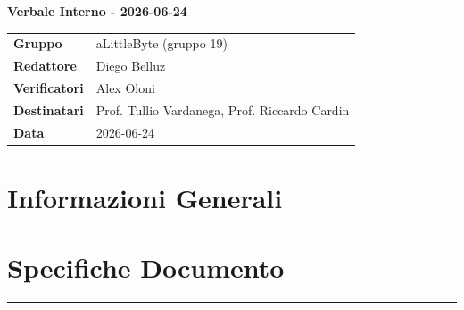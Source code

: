 \documentclass[a4paper,12pt]{article}
\begin{document}
\thispagestyle{firstpage}

\vspace*{0.5cm}

\begin{center}
    {\LARGE \textbf{Verbale Interno - 2026-06-24}}
\end{center}

\vspace{1.5cm}

\begin{center}
    \renewcommand{\arraystretch}{1.3}
    \begin{tcolorbox}[
        width=0.92\textwidth,
        colback=gray!6,
        colframe=gray!45,
        boxrule=0.5pt,
        arc=2mm,
        boxsep=0pt,
        left=8pt, right=8pt, top=8pt, bottom=8pt
    ]
        \begin{tabularx}{\linewidth}{>{\bfseries}p{3.5cm} X}
            Gruppo      & aLittleByte (gruppo 19) \\
            Redattore   & Diego Belluz \\
            Verificatori & Alex Oloni\\
            Destinatari & Prof. Tullio Vardanega, Prof. Riccardo Cardin \\
            Data        & 2026-06-24\\
        \end{tabularx}
    \end{tcolorbox}
\end{center}

\newpage

\tableofcontents
\newpage
\section{Informazioni Generali}
\section*{Specifiche Documento}
\hrule
\vspace{1cm}
\end{document}
